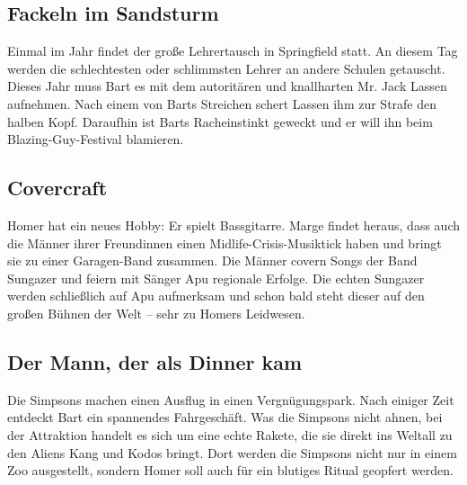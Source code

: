 \subsection{Fackeln im Sandsturm}
Einmal im Jahr findet der große Lehrertausch in Springfield statt. An diesem Tag werden die schlechtesten oder schlimmsten Lehrer an andere Schulen getauscht. Dieses Jahr muss Bart es mit dem autoritären und knallharten Mr. Jack Lassen aufnehmen. Nach einem von Barts Streichen schert Lassen ihm zur Strafe den halben Kopf. Daraufhin ist Barts Racheinstinkt geweckt und er will ihn beim Blazing-Guy-Festival blamieren.


\subsection{Covercraft}
Homer hat ein neues Hobby: Er spielt Bassgitarre. Marge findet heraus, dass auch die Männer ihrer Freundinnen einen Midlife-Crisis-Musiktick haben und bringt sie zu einer Garagen-Band zusammen. Die Männer covern Songs der Band Sungazer und feiern mit Sänger Apu regionale Erfolge. Die echten Sungazer werden schließlich auf Apu aufmerksam und schon bald steht dieser auf den großen Bühnen der Welt -- sehr zu Homers Leidwesen.


\subsection{Der Mann, der als Dinner kam}\label{RABF15}
Die Simpsons machen einen Ausflug in einen Vergnügungspark. Nach einiger Zeit entdeckt Bart ein spannendes Fahrgeschäft. Was die Simpsons nicht ahnen, bei der Attraktion handelt es sich um eine echte Rakete, die sie direkt ins Weltall zu den Aliens Kang und Kodos bringt. Dort werden die Simpsons nicht nur in einem Zoo ausgestellt, sondern Homer soll auch für ein blutiges Ritual geopfert werden.

